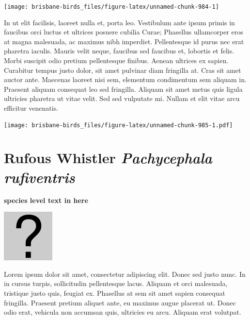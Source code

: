 \documentclass[]{book}
\let\origfigure\figure
\let\endorigfigure\endfigure
\renewenvironment{figure}[1][2] {
  \expandafter\origfigure\expandafter[H]
} {
  \endorigfigure
}
\begin{document}
\begin{figure}
\texttt{[image: brisbane-birds\_files/figure-latex/unnamed-chunk-984-1]} \caption{insert figure caption}\label{fig:unnamed-chunk-984}
\end{figure}

In ut elit facilisis, laoreet nulla et, porta leo. Vestibulum ante ipsum
primis in faucibus orci luctus et ultrices posuere cubilia Curae;
Phasellus ullamcorper eros at magna malesuada, ac maximus nibh
imperdiet. Pellentesque id purus nec erat pharetra iaculis. Mauris velit
neque, faucibus sed faucibus et, lobortis et felis. Morbi suscipit odio
pretium pellentesque finibus. Aenean ultrices ex sapien. Curabitur
tempus justo dolor, sit amet pulvinar diam fringilla at. Cras sit amet
auctor ante. Maecenas laoreet nisi sem, elementum condimentum sem
aliquam in. Praesent aliquam consequat leo sed fringilla. Aliquam sit
amet metus quis ligula ultricies pharetra ut vitae velit. Sed sed
vulputate mi. Nullam et elit vitae arcu efficitur venenatis.

\begin{figure}
\centering
\texttt{[image: brisbane-birds\_files/figure-latex/unnamed-chunk-985-1.pdf]}
\caption{\label{fig:unnamed-chunk-985}insert figure caption}
\end{figure}

\section{\texorpdfstring{Rufous Whistler \emph{Pachycephala
rufiventris}}{Rufous Whistler Pachycephala rufiventris}}\label{rufous-whistler-pachycephala-rufiventris}

\textbf{species level text in here}

\begin{figure}
\centering
\includegraphics{assets/missing.png}
\caption{No image for species}
\end{figure}

Lorem ipsum dolor sit amet, consectetur adipiscing elit. Donec sed justo
nunc. In in cursus turpis, sollicitudin pellentesque lacus. Aliquam et
orci malesuada, tristique justo quis, feugiat ex. Phasellus at sem sit
amet sapien consequat fringilla. Praesent pretium aliquet ante, eu
maximus augue placerat ut. Donec odio erat, vehicula non accumsan quis,
ultricies eu arcu. Aliquam erat volutpat.
\end{document}
